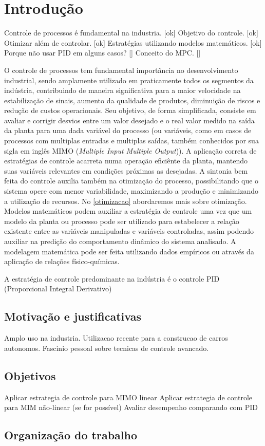 \chapter{Introdução}

Controle de processos é fundamental na industria.	[ok]
Objetivo do controle.								[ok]
Otimizar além de controlar.							[ok]
Estratégias utilizando modelos matemáticos.			[ok]
Porque não usar PID em alguns casos?				[]
Conceito do MPC.									[]

O controle de processos tem fundamental importância no desenvolvimento industrial, sendo amplamente utilizado em praticamente todos os segmentos da indústria, contribuindo de maneira significativa para a maior velocidade na estabilização de sinais, aumento da qualidade de produtos, diminuição de riscos e redução de custos operacionais. Seu objetivo, de forma simplificada, consiste em avaliar e corrigir desvios entre um valor desejado e o real valor medido na saída da planta para uma dada variável do processo (ou variáveis, como em casos de processos com multiplas entradas e multiplas saídas, também conhecidos por sua sigla em inglês MIMO (\textit{Multiple Input Multiple Output})). A aplicação correta de estratégias de controle acarreta numa operação eficiênte da planta, mantendo suas variáveis relevantes em condições próximas as desejadas. A sintonia bem feita do controle auxilia também na otimização do processo, possibilitando que o sistema opere com menor variabilidade, maximizando a produção e minimizando a utilização de recursos. No \autoref{otimizacao} abordaremos mais sobre otimização.
Modelos matemáticos podem auxiliar a estratégia de controle uma vez que um modelo da planta ou processo pode ser utilizado para estabelecer a relação existente entre as variáveis manipuladas e variáveis controladas, assim podendo auxiliar na predição do comportamento dinâmico do sistema analisado. A modelagem matemática pode ser feita utilizando dados empíricos ou através da aplicação de relações físico-químicas.

A estratégia de controle predominante na indústria é o controle PID (Proporcional Integral Derivativo)


\section{Motivação e justificativas}

Amplo uso na industria.
Utilizacao recente para a construcao de carros autonomos.
Fascinio pessoal sobre tecnicas de controle avancado.

\section{Objetivos}

Aplicar estrategia de controle para MIMO linear
Aplicar estrategia de controle para MIM não-linear (se for possível)
Avaliar desempenho comparando com PID

\section{Organização do trabalho}